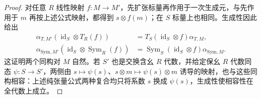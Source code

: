 \begin{proof}
	对任意 \(R\) 线性映射 \(f:M\to M'\)，先扩张标量再作用于一次生成元，与先作用于 \(m\) 再按上述公式映射，都得到 \(s\otimes f(m)\)；在 \(S\) 标量上也相同。生成性因此给出
	\[
		\begin{aligned}
			\alpha_{T,M'}(\operatorname{id}_S\otimes T_R(f)) &=T_S(\operatorname{id}_S\otimes f)\alpha_{T,M},\\
			\alpha_{\mathrm{Sym},M'}(\operatorname{id}_S\otimes\operatorname{Sym}_R(f)) &=\operatorname{Sym}_S(\operatorname{id}_S\otimes f)\alpha_{\mathrm{Sym},M}.
		\end{aligned}
	\]
	这证明两个同构对 \(M\) 自然。若 \(S'\) 也是交换含幺 \(R\) 代数，并给定保幺 \(R\) 代数同态 \(\psi:S\to S'\)，两侧由 \(s\mapsto\psi(s)\)、\(s\otimes m\mapsto\psi(s)\otimes m\) 诱导的映射，也与这些同构相容：上述纯张量公式两种复合均只将系数 \(s\) 换成 \(\psi(s)\)，生成性使相容性在全代数上成立。
\end{proof}
